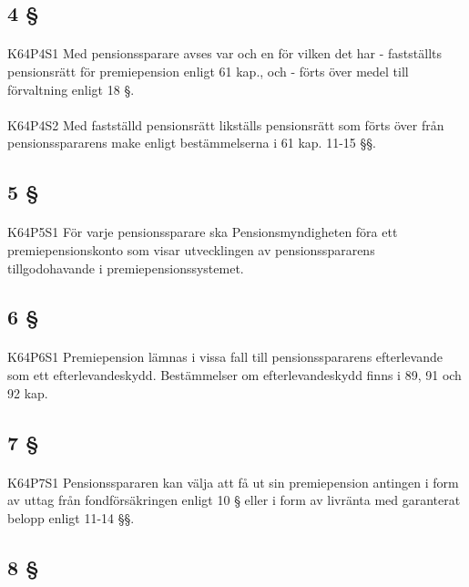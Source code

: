 \documentclass[a4paper,notitlepage,openany,10pt]{book}
\begin{document}
\subsection*{4 §}
\paragraph*{}
{\tiny K64P4S1}
Med pensionssparare avses var och en för vilken det har
\newline - fastställts pensionsrätt för premiepension enligt 61 kap., och
\newline - förts över medel till förvaltning enligt 18 §.
\paragraph*{}
{\tiny K64P4S2}
Med fastställd pensionsrätt likställs pensionsrätt som förts över från pensionsspararens make enligt bestämmelserna i 61 kap. 11-15 §§.
\subsection*{5 §}
\paragraph*{}
{\tiny K64P5S1}
För varje pensionssparare ska Pensionsmyndigheten föra ett premiepensionskonto som visar utvecklingen av pensionsspararens tillgodohavande i premiepensionssystemet.
\subsection*{6 §}
\paragraph*{}
{\tiny K64P6S1}
Premiepension lämnas i vissa fall till pensionsspararens efterlevande som ett efterlevandeskydd. Bestämmelser om efterlevandeskydd finns i 89, 91 och 92 kap.
\subsection*{7 §}
\paragraph*{}
{\tiny K64P7S1}
Pensionsspararen kan välja att få ut sin premiepension antingen i form av uttag från fondförsäkringen enligt 10 § eller i form av livränta med garanterat belopp enligt 11-14 §§.
\subsection*{8 §}
\end{document}
